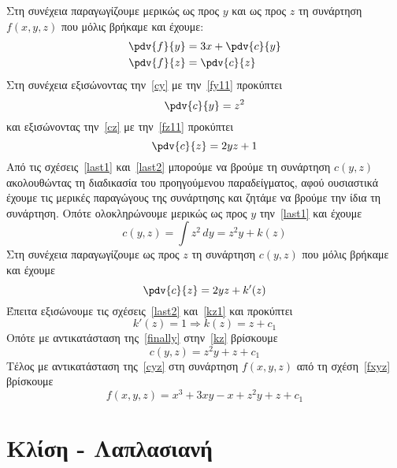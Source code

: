 \begin{solution}
\begin{description}
\begin{equation}
      \end{equation}
      Στη συνέχεια παραγωγίζουμε μερικώς ως προς $y$ και ως προς $z$  
      τη συνάρτηση $f(x,y,z)$ που μόλις βρήκαμε και έχουμε:
      \begin{align}
        \pdv{f}{y} &= 3x + \pdv{c}{y} \label{cy} \\
        \pdv{f}{z} &= \pdv{c}{z} \label{cz}
      \end{align}
      Στη συνέχεια εξισώνοντας την~\eqref{cy} με την~\eqref{fy11} προκύπτει 
      \begin{equation}
        \pdv{c}{y} = z^{2} \label{last1}
      \end{equation}
      και εξισώνοντας την~\eqref{cz} με την~\eqref{fz11} προκύπτει
      \begin{equation}
        \pdv{c}{z} = 2yz+1 \label{last2}
      \end{equation}
      Από τις σχέσεις~\eqref{last1} και~\eqref{last2} μπορούμε να βρούμε τη συνάρτηση 
      $ c(y,z) $ ακολουθώντας τη διαδικασία του προηγούμενου παραδείγματος, αφού 
      ουσιαστικά έχουμε τις μερικές παραγώγους της συνάρτησης και ζητάμε 
      να βρούμε την ίδια τη συνάρτηση. Οπότε ολοκληρώνουμε μερικώς ως προς 
      $y$ την~\eqref{last1} και έχουμε
      \begin{equation}
        c(y,z) = \int z^{2} \,{dy} = z^{2}y + k(z) \label{kz} 
      \end{equation} 
      Στη συνέχεια παραγωγίζουμε ως προς $z$ τη συνάρτηση $ c(y,z) $ που μόλις βρήκαμε 
      και έχουμε
      \begin{equation}
        \pdv{c}{z} = 2yz + k'(z) \label{kz1}
      \end{equation} 
      Έπειτα εξισώνουμε τις σχέσεις~\eqref{last2} και~\eqref{kz1} και προκύπτει 
      \[
        k'(z) = 1 \Rightarrow k(z) = z + c_{1} \label{finally}
      \] 
      Οπότε με αντικατάσταση της~\eqref{finally} στην~\eqref{kz} βρίσκουμε 
      \begin{equation}
        c(y,z) = z^{2}y+z + c_{1} \label{cyz}
      \end{equation}
      Τέλος με αντικατάσταση της~\eqref{cyz} στη συνάρτηση $ f(x,y,z) $ από τη 
      σχέση~\eqref{fxyz} βρίσκουμε
      \[
        f(x,y,z) = x^{3}+3xy-x+z^{2}y+z+ c_{1} 
      \] 
  \end{description}
\end{solution}

\section{Κλίση - Λαπλασιανή}

